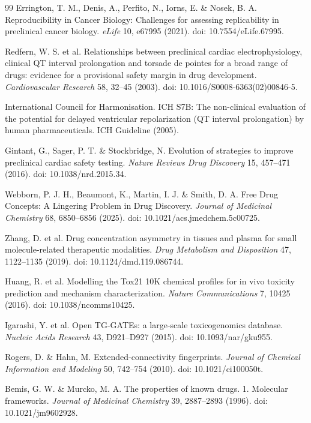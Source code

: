{\begin{thebibliography}{99}
 Errington, T. M., Denis, A., Perfito, N., Iorns, E. \&
Nosek, B. A. Reproducibility in Cancer Biology: Challenges for assessing
replicability in preclinical cancer biology. \textit{eLife} 10, e67995 (2021).
doi: 10.7554/eLife.67995.

 Redfern, W. S. et al. Relationships between preclinical
cardiac electrophysiology, clinical QT interval prolongation and torsade de
pointes for a broad range of drugs: evidence for a provisional safety margin in
drug development. \textit{Cardiovascular Research} 58, 32--45 (2003). doi:
10.1016/S0008-6363(02)00846-5.

 International Council for Harmonisation. ICH S7B: The
non-clinical evaluation of the potential for delayed ventricular repolarization
(QT interval prolongation) by human pharmaceuticals. ICH Guideline (2005).

 Gintant, G., Sager, P. T. \& Stockbridge, N. Evolution of
strategies to improve preclinical cardiac safety testing. \textit{Nature Reviews
Drug Discovery} 15, 457--471 (2016). doi: 10.1038/nrd.2015.34.

 Webborn, P. J. H., Beaumont, K., Martin, I. J. \& Smith,
D. A. Free Drug Concepts: A Lingering Problem in Drug Discovery. \textit{Journal
of Medicinal Chemistry} 68, 6850--6856 (2025). doi:
10.1021/acs.jmedchem.5c00725.

 Zhang, D. et al. Drug concentration asymmetry in tissues and
plasma for small molecule-related therapeutic modalities. \textit{Drug
Metabolism and Disposition} 47, 1122--1135 (2019). doi:
10.1124/dmd.119.086744.

 Huang, R. et al. Modelling the Tox21 10K chemical profiles
for in vivo toxicity prediction and mechanism characterization. \textit{Nature
Communications} 7, 10425 (2016). doi: 10.1038/ncomms10425.

 Igarashi, Y. et al. Open TG-GATEs: a large-scale
toxicogenomics database. \textit{Nucleic Acids Research} 43, D921--D927 (2015).
doi: 10.1093/nar/gku955.

 Rogers, D. \& Hahn, M. Extended-connectivity fingerprints.
\textit{Journal of Chemical Information and Modeling} 50, 742--754 (2010). doi:
10.1021/ci100050t.

 Bemis, G. W. \& Murcko, M. A. The properties of known drugs.
1. Molecular frameworks. \textit{Journal of Medicinal Chemistry} 39, 2887--2893
(1996). doi: 10.1021/jm9602928.

\end{thebibliography}
}
